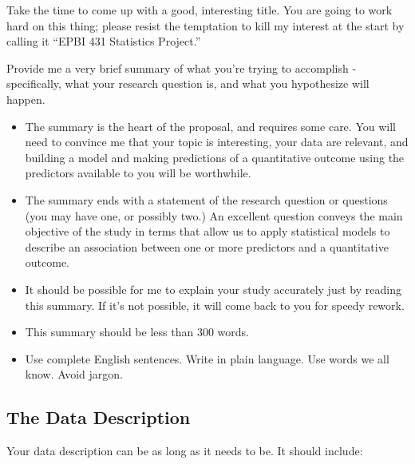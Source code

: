 \documentclass[]{book}
\providecommand{\tightlist}{%
  \setlength{\itemsep}{0pt}\setlength{\parskip}{0pt}}
\theoremstyle{definition}
\theoremstyle{definition}
\theoremstyle{definition}
\theoremstyle{remark}
\begin{document}
Take the time to come up with a good, interesting title. You are going
to work hard on this thing; please resist the temptation to kill my
interest at the start by calling it ``EPBI 431 Statistics Project.''

Provide me a very brief summary of what you're trying to accomplish -
specifically, what your research question is, and what you hypothesize
will happen.

\begin{itemize}
\tightlist
\item
  The summary is the heart of the proposal, and requires some care. You
  will need to convince me that your topic is interesting, your data are
  relevant, and building a model and making predictions of a
  quantitative outcome using the predictors available to you will be
  worthwhile.
\item
  The summary ends with a statement of the research question or
  questions (you may have one, or possibly two.) An excellent question
  conveys the main objective of the study in terms that allow us to
  apply statistical models to describe an association between one or
  more predictors and a quantitative outcome.
\item
  It should be possible for me to explain your study accurately just by
  reading this summary. If it's not possible, it will come back to you
  for speedy rework.
\item
  This summary should be less than 300 words.
\item
  Use complete English sentences. Write in plain language. Use words we
  all know. Avoid jargon.
\end{itemize}

\hypertarget{the-data-description}{%
\subsection{The Data Description}\label{the-data-description}}

Your data description can be as long as it needs to be. It should
include:
\end{document}
